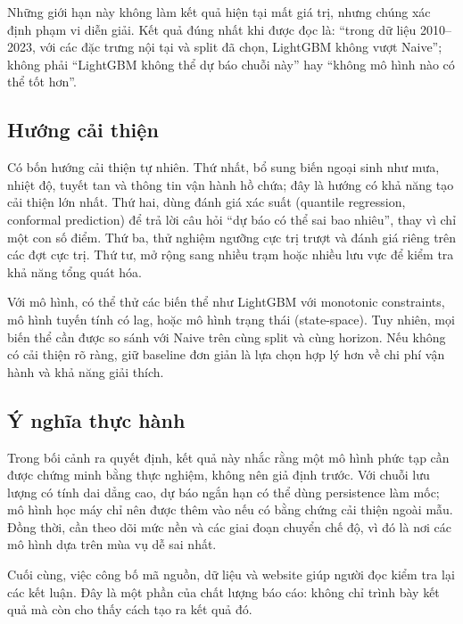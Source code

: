 Những giới hạn này không làm kết quả hiện tại mất giá trị, nhưng chúng xác định
phạm vi diễn giải. Kết quả đúng nhất khi được đọc là: “trong dữ liệu 2010--2023,
với các đặc trưng nội tại và split đã chọn, LightGBM không vượt Naive”; không phải
“LightGBM không thể dự báo chuỗi này” hay “không mô hình nào có thể tốt hơn”.

\subsection{Hướng cải thiện}

Có bốn hướng cải thiện tự nhiên. Thứ nhất, bổ sung biến ngoại sinh như mưa, nhiệt
độ, tuyết tan và thông tin vận hành hồ chứa; đây là hướng có khả năng tạo cải thiện
lớn nhất. Thứ hai, dùng đánh giá xác suất (quantile regression, conformal prediction)
để trả lời câu hỏi “dự báo có thể sai bao nhiêu”, thay vì chỉ một con số điểm. Thứ
ba, thử nghiệm ngưỡng cực trị trượt và đánh giá riêng trên các đợt cực trị. Thứ tư,
mở rộng sang nhiều trạm hoặc nhiều lưu vực để kiểm tra khả năng tổng quát hóa.

Với mô hình, có thể thử các biến thể như LightGBM với monotonic constraints, mô hình
tuyến tính có lag, hoặc mô hình trạng thái (state-space). Tuy nhiên, mọi biến thể cần
được so sánh với Naive trên cùng split và cùng horizon. Nếu không có cải thiện rõ
ràng, giữ baseline đơn giản là lựa chọn hợp lý hơn về chi phí vận hành và khả năng
giải thích.

\subsection{Ý nghĩa thực hành}

Trong bối cảnh ra quyết định, kết quả này nhắc rằng một mô hình phức tạp cần được
chứng minh bằng thực nghiệm, không nên giả định trước. Với chuỗi lưu lượng có tính
dai dẳng cao, dự báo ngắn hạn có thể dùng persistence làm mốc; mô hình học máy chỉ
nên được thêm vào nếu có bằng chứng cải thiện ngoài mẫu. Đồng thời, cần theo dõi
mức nền và các giai đoạn chuyển chế độ, vì đó là nơi các mô hình dựa trên mùa vụ dễ
sai nhất.

Cuối cùng, việc công bố mã nguồn, dữ liệu và website giúp người đọc kiểm tra lại
các kết luận. Đây là một phần của chất lượng báo cáo: không chỉ trình bày kết quả
mà còn cho thấy cách tạo ra kết quả đó.
